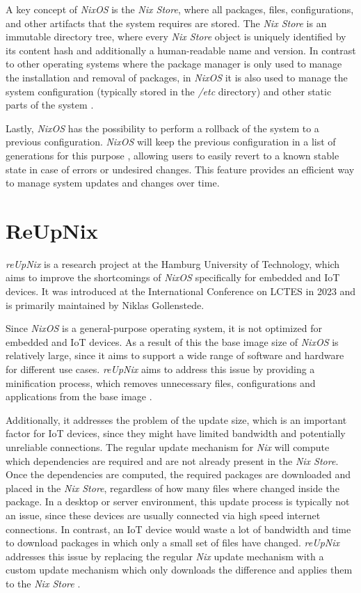 A key concept of \textit{NixOS} is the \textit{Nix Store}, where all packages,
files, configurations, and other artifacts that the system requires are stored.
The \textit{Nix Store} is an immutable directory tree, where every \textit{Nix Store}
object is uniquely identified by its content hash and additionally a
human-readable name and version. In contrast to other operating systems where the package
manager is only used to manage the installation and removal of packages, in \textit{NixOS}
it is also used to manage the system configuration (typically stored in the
\textit{/etc} directory) and other static parts of the
system \cite{1411255}.

Lastly, \textit{NixOS} has the possibility to perform a rollback of the system to a
previous configuration. \textit{NixOS} will keep the previous configuration
in a list of generations for this purpose \cite{1411255}, allowing users to easily
revert to a known stable state in case of errors or undesired changes. This
feature provides an efficient way to manage system updates and changes over time.

\section{ReUpNix}
\textit{reUpNix} is a research project at the Hamburg University of Technology,
which aims to improve the shortcomings of \textit{NixOS} specifically for
embedded and \ac{IoT} devices. It was introduced at the International Conference on
\ac{LCTES} in 2023 and is primarily maintained by Niklas Gollenstede.

Since \textit{NixOS} is a general-purpose operating system, it is not optimized
for embedded and \ac{IoT} devices. As a result of this the base image size of
\textit{NixOS} is relatively large, since it aims to support a wide range of
software and hardware for different use cases. \textit{reUpNix} aims to address
this issue by providing a minification process, which removes unnecessary
files, configurations and applications from the base image \cite{gollenstede:23:lctes}.

Additionally, it addresses the problem of the update size, which is an important
factor for \ac{IoT} devices, since they might have limited bandwidth and
potentially unreliable connections. The regular update mechanism for \textit{Nix}
will compute which dependencies are required and are not already present in the \textit{Nix Store}.
Once the dependencies are computed, the required packages are downloaded and
placed in the \textit{Nix Store}, regardless of how many files where changed inside
the package. In a desktop or server environment, this
update process is typically not an issue, since these devices are usually
connected via high speed internet connections. In contrast, an \ac{IoT} device
would waste a lot of bandwidth and time to download packages in which only a
small set of files have changed. \textit{reUpNix} addresses this issue by
replacing the regular \textit{Nix} update mechanism with a custom update mechanism
which only downloads the difference and applies them to the \textit{Nix Store}
\cite{gollenstede:23:lctes}.

